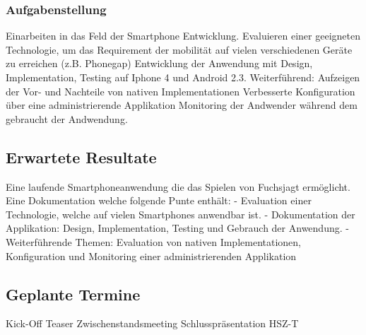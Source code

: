 \subsubsection{Aufgabenstellung} %
\label{ssub:Aufgabenstellung}
Einarbeiten in das Feld der Smartphone Entwicklung.
Evaluieren einer geeigneten Technologie, um das Requirement der mobilität auf vielen verschiedenen Geräte zu erreichen (z.B. Phonegap)
Entwicklung der Anwendung mit Design, Implementation, Testing auf Iphone 4 und Android 2.3.
Weiterführend:
Aufzeigen der Vor- und Nachteile von nativen Implementationen
Verbesserte Konfiguration über eine administrierende Applikation
Monitoring der Andwender während dem gebraucht der Andwendung.

\subsection{Erwartete Resultate} %
\label{sub:Erwartete Resultate}
Eine laufende Smartphoneanwendung die das Spielen von Fuchsjagt ermöglicht.
Eine Dokumentation welche folgende Punte enthält:
- Evaluation einer Technologie, welche auf vielen Smartphones anwendbar ist.
- Dokumentation der Applikation: Design, Implementation, Testing und Gebrauch der Anwendung.
- Weiterführende Themen: Evaluation von nativen Implementationen, Konfiguration und Monitoring einer administrierenden Applikation

\subsection{Geplante Termine} %
\label{sub:Geplante Termine}
Kick-Off
Teaser
Zwischenstandsmeeting        
Schlusspräsentation HSZ-T
